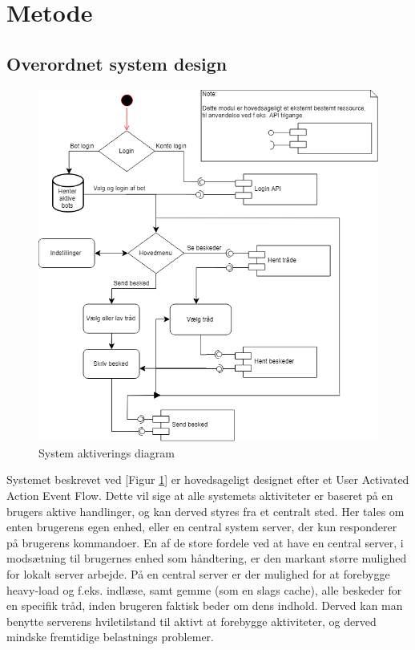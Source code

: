 \section{Metode}
\subsection{Overordnet system design}
\begin{figure}[H]
    \centering
    \includegraphics[width=0.75\linewidth]{Projectdoc/Assets/Illustrationer/system-diagram.png}
    \caption{System aktiverings diagram}
    \label{fig:sysdiagram}
\end{figure}

Systemet beskrevet ved [Figur \ref{fig:sysdiagram}] er hovedsageligt designet efter et User Activated Action Event Flow. 
Dette vil sige at alle systemets aktiviteter er baseret på en brugers aktive handlinger, og kan derved styres fra et centralt sted. Her tales om enten brugerens egen enhed, eller en central system server, der kun responderer på brugerens kommandoer.
En af de store fordele ved at have en central server, i modsætning til brugernes enhed som håndtering, er den markant større mulighed for lokalt server arbejde. På en central server er der mulighed for at forebygge heavy-load og f.eks. indlæse, samt gemme (som en slags cache), alle beskeder for en specifik tråd, inden brugeren faktisk beder om dens indhold. Derved kan man benytte serverens hviletilstand til aktivt at forebygge aktiviteter, og derved mindske fremtidige belastnings problemer.

